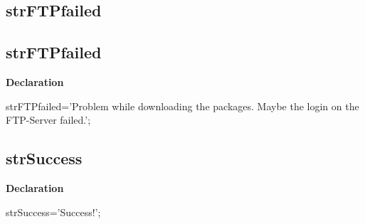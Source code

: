 \documentclass{report}
\newif\ifpdf
\begin{document}
\subsection*{\large{\textbf{strFTPfailed}}\normalsize\hspace{1ex}\hrulefill}
\else
\subsection*{strFTPfailed}
\fi
\label{trstrings-strFTPfailed}
\begin{list}{}{
\setlength{\itemindent}{0cm}
\setlength{\listparindent}{0cm}
\setlength{\leftmargin}{\evensidemargin}
\addtolength{\leftmargin}{\tmplength}
\settowidth{\labelsep}{X}
\addtolength{\leftmargin}{\labelsep}
\setlength{\labelwidth}{\tmplength}
}
\item[\textbf{Declaration}\hfill]
\ifpdf
\begin{flushleft}
\fi
\begin{ttfamily}
strFTPfailed='Problem while downloading the packages. Maybe the login on the FTP-Server failed.';\end{ttfamily}

\ifpdf
\end{flushleft}
\fi

\end{list}
\ifpdf
\subsection*{\large{\textbf{strSuccess}}\normalsize\hspace{1ex}\hrulefill}
\else
\subsection*{strSuccess}
\fi
\label{trstrings-strSuccess}
\begin{list}{}{
\setlength{\itemindent}{0cm}
\setlength{\listparindent}{0cm}
\setlength{\leftmargin}{\evensidemargin}
\addtolength{\leftmargin}{\tmplength}
\settowidth{\labelsep}{X}
\addtolength{\leftmargin}{\labelsep}
\setlength{\labelwidth}{\tmplength}
}
\item[\textbf{Declaration}\hfill]
\ifpdf
\begin{flushleft}
\fi
\begin{ttfamily}
strSuccess='Success!';\end{ttfamily}

\ifpdf
\end{flushleft}
\fi

\end{list}
\ifpdf
\end{document}
